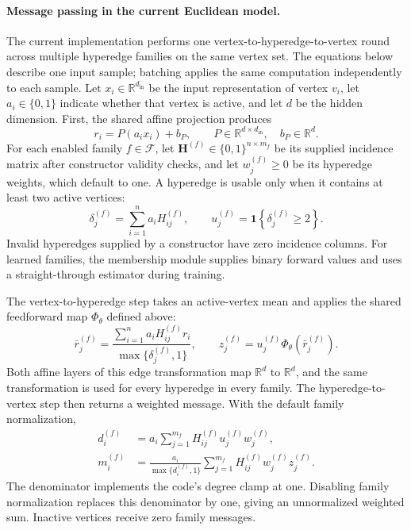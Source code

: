 \documentclass{article}
\theoremstyle{definition}
\theoremstyle{plain}
\begin{document}
\paragraph{Message passing in the current Euclidean model.}
The current implementation performs one vertex-to-hyperedge-to-vertex
round across multiple hyperedge families on the same vertex set.
The equations below describe one input sample; batching applies the
same computation independently to each sample. Let
$x_i\in\mathbb{R}^{d_{\mathrm{in}}}$ be the input representation of
vertex $v_i$, let $a_i\in\{0,1\}$ indicate whether that vertex is
active, and let $d$ be the hidden dimension. First, the shared affine
projection produces
\[
  r_i=P(a_i x_i)+b_P,\qquad
  P\in\mathbb{R}^{d\times d_{\mathrm{in}}},\quad
  b_P\in\mathbb{R}^{d}.
\]
For each enabled family $f\in\mathcal{F}$, let
$\mathbf{H}^{(f)}\in\{0,1\}^{n\times m_f}$ be its supplied incidence
matrix after constructor validity checks, and let $w_j^{(f)}\geq0$
be its hyperedge weights, which default to one. A hyperedge is usable
only when it contains at least two active vertices:
\[
  \delta_j^{(f)}=\sum_{i=1}^{n}a_i H_{ij}^{(f)},\qquad
  u_j^{(f)}=\mathbf{1}\!\left\{\delta_j^{(f)}\geq2\right\}.
\]
Invalid hyperedges supplied by a constructor have zero incidence
columns. For learned families, the membership module supplies binary
forward values and uses a straight-through estimator during training.

The vertex-to-hyperedge step takes an active-vertex mean and applies
the shared feedforward map $\Phi_\theta$ defined above:
\[
  \bar r_j^{(f)}=
    \frac{\sum_{i=1}^{n}a_i H_{ij}^{(f)}r_i}
         {\max\{\delta_j^{(f)},1\}},\qquad
  z_j^{(f)}=u_j^{(f)}\Phi_\theta\!\left(\bar r_j^{(f)}\right).
\]
Both affine layers of this edge transformation map
$\mathbb{R}^{d}$ to $\mathbb{R}^{d}$, and the same transformation is
used for every hyperedge in every family. The hyperedge-to-vertex step
then returns a weighted message. With the default family normalization,
\begin{align*}
  d_i^{(f)}
    &= a_i\sum_{j=1}^{m_f}H_{ij}^{(f)}u_j^{(f)}w_j^{(f)},\\
  m_i^{(f)}
    &= \frac{a_i}{\max\{d_i^{(f)},1\}}
       \sum_{j=1}^{m_f}H_{ij}^{(f)}w_j^{(f)}z_j^{(f)}.
\end{align*}
The denominator implements the code's degree clamp at one. Disabling
family normalization replaces this denominator by one, giving an
unnormalized weighted sum. Inactive vertices receive zero family
messages.
\end{document}
